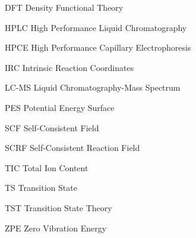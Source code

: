 
\begin{denotation}[3cm]
  \item[DFT] Density Functional Theory
  \item[HPLC] High Performance Liquid Chromatography
  \item[HPCE] High Performance Capillary Electrophoresis
  \item[IRC] Intrinsic Reaction Coordinates
  \item[LC-MS] Liquid Chromatography-Mass Spectrum
  \item[PES] Potential Energy Surface
  \item[SCF] Self-Consistent Field
  \item[SCRF] Self-Consistent Reaction Field
  \item[TIC] Total Ion Content
  \item[TS] Transition State
  \item[TST] Transition State Theory
  \item[ZPE] Zero Vibration Energy
\end{denotation}
